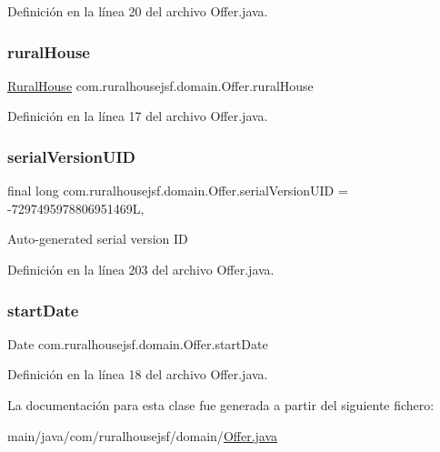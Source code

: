 Definición en la línea 20 del archivo Offer.\+java.

\mbox{\label{classcom_1_1ruralhousejsf_1_1domain_1_1_offer_a87036858904c59c964d2c75137a97323}} 
\subsubsection{\texorpdfstring{ruralHouse}{ruralHouse}}
{\footnotesize\ttfamily \mbox{\hyperlink{classcom_1_1ruralhousejsf_1_1domain_1_1_rural_house}{Rural\+House}} com.\+ruralhousejsf.\+domain.\+Offer.\+rural\+House\hspace{0.3cm}{\ttfamily [private]}}



Definición en la línea 17 del archivo Offer.\+java.

\mbox{\label{classcom_1_1ruralhousejsf_1_1domain_1_1_offer_a4516c2ff68502d92f1405b8478e9fe6f}} 
\subsubsection{\texorpdfstring{serialVersionUID}{serialVersionUID}}
{\footnotesize\ttfamily final long com.\+ruralhousejsf.\+domain.\+Offer.\+serial\+Version\+U\+ID = -\/7297495978806951469L\hspace{0.3cm}{\ttfamily [static]}, {\ttfamily [private]}}

Auto-\/generated serial version ID 

Definición en la línea 203 del archivo Offer.\+java.

\mbox{\label{classcom_1_1ruralhousejsf_1_1domain_1_1_offer_a3c4e8f6eb72413f6f76b1e4b05404ea8}} 
\subsubsection{\texorpdfstring{startDate}{startDate}}
{\footnotesize\ttfamily Date com.\+ruralhousejsf.\+domain.\+Offer.\+start\+Date\hspace{0.3cm}{\ttfamily [private]}}



Definición en la línea 18 del archivo Offer.\+java.



La documentación para esta clase fue generada a partir del siguiente fichero\+:\begin{DoxyCompactItemize}
\item 
main/java/com/ruralhousejsf/domain/\mbox{\hyperlink{_offer_8java}{Offer.\+java}}\end{DoxyCompactItemize}
